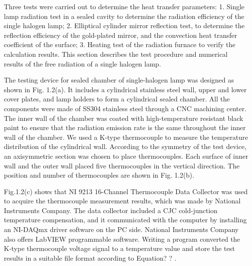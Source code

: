Three tests were carried out to determine the heat transfer parameters:
1. Single lamp radiation test in a sealed cavity to determine the radiation efficiency of the single halogen lamp;
2. Elliptical cylinder mirror reflection test, to determine the reflection efficiency of the gold-plated mirror, and the convection heat transfer coefficient of the surface;
3. Heating test of the radiation furnace to verify the calculation results.
This section describes the test procedure and numerical results of the free radiation of a single halogen lamp.

The testing device for sealed chamber of single-halogen lamp was designed as shown in Fig. 1.2(a). It includes a cylindrical stainless steel wall, upper and lower cover plates, and lamp holders to form a cylindrical sealed chamber.
All the components were made of SS304 stainless steel through a CNC machining center. The inner wall of the chamber was coated with high-temperature resistant black paint to ensure that the radiation emission rate is the same throughout the inner wall of the chamber.
We used a K-type thermocouple to measure the temperature distribution of the cylindrical wall.
According to the symmetry of the test device, an axisymmetric section was chosen to place thermocouples. Each surface of inner wall and the outer wall placed five thermocouples in the vertical direction. The position and number of thermocouples are shown in Fig. 1.2(b).

Fig.1.2(c) shows that  NI 9213 16-Channel Thermocouple Data Collector was used to acquire the thermocouple measurement results, which was made by National Instruments Company. The data collector included a CJC cold-junction temperature compensation, and it communicated with the computer by installing an NI-DAQmx driver software on the PC side. National Instruments Company also offers LabVIEW programmable software. Writing a program converted the K-type thermocouple voltage signal to a temperature value and store the test results in a suitable file format according to Equation? ? .

